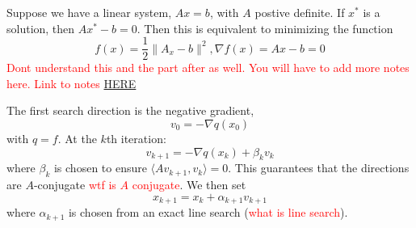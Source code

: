 \begin{problem}
  Suppose we have a linear system, $Ax = b$, with $A$ postive definite. If $x^*$ is a solution, then $Ax^* - b = 0$. Then this is equivalent to minimizing the function $$f(x) = \frac{1}{2} \|A_x - b\|^2, \nabla f(x) = Ax - b = 0$$ \textcolor{red}{Dont understand this and the part after as well. You will have to add more notes here. Link to notes \href{https://cdn-uploads.piazza.com/paste/kcat3sa7dyu2te/bf8109b64a3bff7a1ffbacd0a5d43d03fabf0c01350afdf12f55b5382b6571da/Lecture_6.pdf}{HERE}}
\end{problem}
\begin{theorem}
  The first search direction is the negative gradient, $$v_0 = -\nabla q(x_0)$$ with $q = f$. At the $k$th iteration:
  $$v_{k+1} = -\nabla q(x_k) + \beta_k v_k$$
  where $\beta_k$ is chosen to ensure $\langle Av_{k+1}, v_k \rangle = 0$. This guarantees that the directions are $A$-conjugate \textcolor{red}{wtf is $A$ conjugate}. We then set $$x_{k+1} = x_k + \alpha_{k+1}v_{k+1}$$ where $\alpha_{k+1}$ is chosen from an exact line search (\textcolor{red}{what is line search}).
\end{theorem}